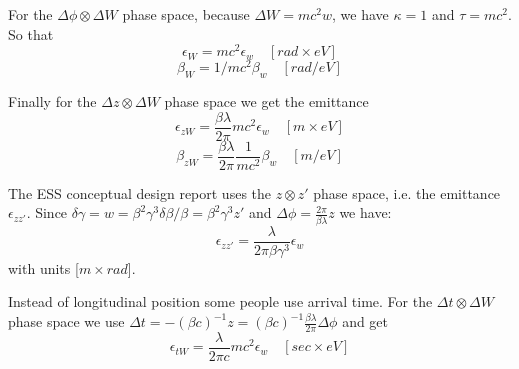 \documentclass{article}
\begin{document}
For the $ \Delta\phi\otimes\Delta W $ phase space, because $ \Delta W = mc^{2} w $, we have $ \kappa = 1 $ and $ \tau = mc^{2} $.
So that 
\begin{equation}
\epsilon_{W} = mc^{2}\epsilon_{w}\quad [rad\times eV] \label{}
\end{equation}
\begin{equation}
\beta_{W} = 1/mc^{2}\beta_{w}\quad  [rad/eV] \label{}
\end{equation}

Finally for the $ \Delta z\otimes\Delta W $ phase space we get the emittance
\begin{equation}
\epsilon_{zW} = \frac{\beta \lambda} {2 \pi}mc^{2}\epsilon_{w}\quad  [m\times eV] \label{}
\end{equation}
\begin{equation}
\beta_{zW} = \frac{\beta \lambda} {2 \pi}\frac{1}{mc^{2}}\beta_{w}\quad  [m/eV] \label{}
\end{equation}

The ESS conceptual design report uses the $z \otimes z'$ phase space, i.e. the emittance $ \epsilon_{zz'} $. Since $ \delta\gamma = w = \beta^{2}\gamma^{3} \delta\beta / \beta = \beta^{2}\gamma^{3} z' $ and 
$\Delta\phi  = \frac{2\pi}{\beta\lambda}z$ we have:
\begin{equation}
\epsilon_{zz'} = \frac{\lambda}{2\pi\beta\gamma^{3}}\epsilon_{w} \label{}
\end{equation}
with units [$m\times rad$].

Instead of longitudinal position some people use arrival time. For the $ \Delta t \otimes \Delta W $ phase space we use 
$\Delta t = -(\beta c)^{-1} z = (\beta c)^{-1} \frac{\beta\lambda}{2\pi} \Delta \phi$ and get
\begin{equation}
\epsilon_{tW} = \frac{\lambda} {2 \pi c} mc^{2}\epsilon_{w}\quad  [sec\times eV]\label{}
\end{equation}
\end{document}

